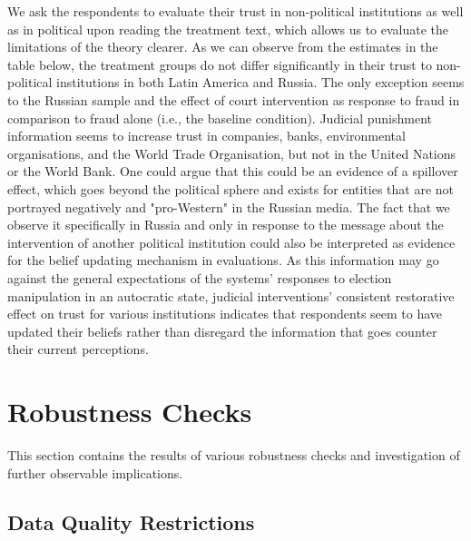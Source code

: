 \documentclass[11pt, ngerman,english,a4]{article}
\begin{document}
We ask the respondents to evaluate their trust in non-political institutions as well as in political upon reading the treatment text, which allows us to evaluate the limitations of the theory clearer. As we can observe from the estimates in the table below, the treatment groups do not differ significantly in their trust to non-political institutions in both Latin America and Russia. The only exception seems to the Russian sample and the effect of court intervention as response to fraud in comparison to fraud alone (i.e., the baseline condition). Judicial punishment information seems to increase trust in companies, banks, environmental organisations, and the World Trade Organisation, but not in the United Nations or the World Bank. One could argue that this could be an evidence of a spillover effect, which goes beyond the political sphere and exists for entities that are not portrayed negatively and "pro-Western" in the Russian media. The fact that we observe it specifically in Russia and only in response to the message about the intervention of another political institution could also be interpreted as evidence for the belief updating mechanism in evaluations. As this information may go against the general expectations of the systems' responses to election manipulation in an autocratic state, judicial interventions' consistent restorative effect on trust for various institutions indicates that respondents seem to have updated their beliefs rather than disregard the information that goes counter their current perceptions. 


% 
    

\normalsize

\clearpage
\section*{Robustness Checks}

This section contains the results of various robustness checks and investigation of further observable implications.

\subsection*{Data Quality Restrictions}

% 

% 
\end{document}
